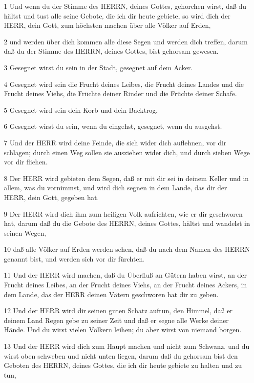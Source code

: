 \par 1 Und wenn du der Stimme des HERRN, deines Gottes, gehorchen wirst, daß du hältst und tust alle seine Gebote, die ich dir heute gebiete, so wird dich der HERR, dein Gott, zum höchsten machen über alle Völker auf Erden,
\par 2 und werden über dich kommen alle diese Segen und werden dich treffen, darum daß du der Stimme des HERRN, deines Gottes, bist gehorsam gewesen.
\par 3 Gesegnet wirst du sein in der Stadt, gesegnet auf dem Acker.
\par 4 Gesegnet wird sein die Frucht deines Leibes, die Frucht deines Landes und die Frucht deines Viehs, die Früchte deiner Rinder und die Früchte deiner Schafe.
\par 5 Gesegnet wird sein dein Korb und dein Backtrog.
\par 6 Gesegnet wirst du sein, wenn du eingehst, gesegnet, wenn du ausgehst.
\par 7 Und der HERR wird deine Feinde, die sich wider dich auflehnen, vor dir schlagen; durch einen Weg sollen sie ausziehen wider dich, und durch sieben Wege vor dir fliehen.
\par 8 Der HERR wird gebieten dem Segen, daß er mit dir sei in deinem Keller und in allem, was du vornimmst, und wird dich segnen in dem Lande, das dir der HERR, dein Gott, gegeben hat.
\par 9 Der HERR wird dich ihm zum heiligen Volk aufrichten, wie er dir geschworen hat, darum daß du die Gebote des HERRN, deines Gottes, hältst und wandelst in seinen Wegen,
\par 10 daß alle Völker auf Erden werden sehen, daß du nach dem Namen des HERRN genannt bist, und werden sich vor dir fürchten.
\par 11 Und der HERR wird machen, daß du Überfluß an Gütern haben wirst, an der Frucht deines Leibes, an der Frucht deines Viehs, an der Frucht deines Ackers, in dem Lande, das der HERR deinen Vätern geschworen hat dir zu geben.
\par 12 Und der HERR wird dir seinen guten Schatz auftun, den Himmel, daß er deinem Land Regen gebe zu seiner Zeit und daß er segne alle Werke deiner Hände. Und du wirst vielen Völkern leihen; du aber wirst von niemand borgen.
\par 13 Und der HERR wird dich zum Haupt machen und nicht zum Schwanz, und du wirst oben schweben und nicht unten liegen, darum daß du gehorsam bist den Geboten des HERRN, deines Gottes, die ich dir heute gebiete zu halten und zu tun,
